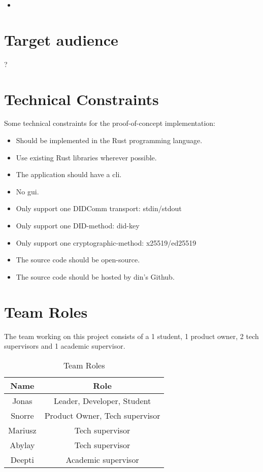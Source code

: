 \begin{itemize}
    \item 
\end{itemize}


\section{Target audience}

?


\section{Technical Constraints}

Some technical constraints for the proof-of-concept implementation:

\begin{itemize}
    \item Should be implemented in the Rust programming language.
    \item Use existing Rust libraries wherever possible.
    \item The application should have a \acrfull{cli}.
    \item No \acrfull{gui}.
    \item Only support one DIDComm transport: \acrshort{stdin}/\acrshort{stdout}
    \item Only support one DID-method: \gls{did-key}
    \item Only support one cryptographic-method: x25519/ed25519
    \item The source code should be open-source.
    \item The source code should be hosted by \acrshort{din}'s Github.
\end{itemize}



\newpage

\section{Team Roles}

The team working on this project consists of a 1 student, 1 product owner, 2 tech supervisors and 1 academic supervisor.

\begin{table}
  \centering
  \caption{Team Roles}
  \label{tab:example1}
  \begin{tabular}{cc}
    \hline
    Name  & Role \\
    \hline
    Jonas       & Leader, Developer, Student         \\
    Snorre      & Product Owner, Tech supervisor \\
    Mariusz     & Tech supervisor \\
    Abylay      & Tech supervisor \\
    Deepti      & Academic supervisor \\
    \hline
  \end{tabular}
\end{table}



